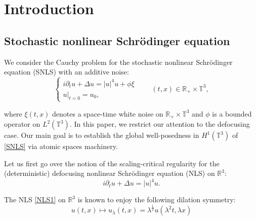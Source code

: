 \documentclass[letterpaper, 11pt,  reqno]{amsart}
\newcommand{\1}{\hspace{0.5mm}\text{I}\hspace{0.5mm}}
\newcommand{\noi}{\noindent}
\newcommand{\R}{\mathbb{R}}
\newcommand{\T}{\mathbb{T}}
\newcommand{\Dl}{\Delta}
\newcommand{\ld}{\lambda}
\newcommand{\dt}{\partial_t}
\numberwithin{equation}{section}
\numberwithin{theorem}{section}
\begin{document}









\maketitle



\tableofcontents


\section{Introduction}
\subsection{Stochastic nonlinear Schr\"odinger equation}
We consider the Cauchy problem for the stochastic nonlinear Schr\"{o}dinger equation (SNLS) with an additive noise:
\begin{equation}
\label{SNLS}
\begin{cases}
 i \dt u + \Dl  u = |u|^{4} u + \phi \xi \\
 u|_{t = 0} = u_0,
\end{cases}
\qquad (t, x) \in \R_+\times \T^3,
\end{equation}



\noi
where $\xi (t,x)$ denotes a space-time white noise on $\R_+\times \T^3$ and $\phi$ is a bounded operator on $L^2(\T^3)$. In this paper, we restrict our attention to the defocusing case.
Our main goal is to  establish the global well-posedness in $H^1(\T^3)$ of \eqref{SNLS}
via atomic spaces machinery.


Let us first go over the notion of the scaling-critical regularity
for the  (deterministic) defocusing nonlinear Schr\"odinger equation (NLS) on $\R^3$:
\begin{equation}
i \partial_t u +   \Delta u =  |u|^{4} u.
\label{NLS1}
\end{equation}



\noi
The NLS  \eqref{NLS1} on $\R^3$ is known to enjoy the following dilation symmetry:
\begin{equation*}
 u(t, x) \longmapsto u_\ld(t, x) = \ld^{\frac 12 } u (\ld^{2}t, \ld x)
\end{equation*}
\end{document}
